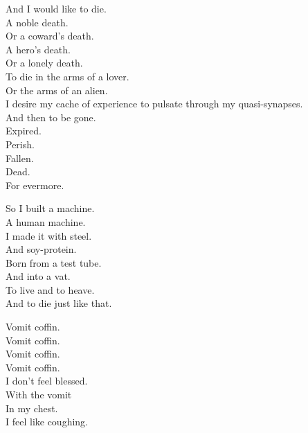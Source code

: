 And I would like to die. \\
A noble death. \\
Or a coward's death. \\
A hero's death. \\
Or a lonely death. \\
To die in the arms of a lover. \\
Or the arms of an alien. \\
I desire my cache of experience to pulsate through my quasi-synapses. \\
And then to be gone. \\
Expired. \\
Perish. \\
Fallen. \\
Dead. \\
For evermore. \\





So I built a machine. \\
A human machine. \\
I made it with steel. \\
And soy-protein. \\

Born from a test tube. \\
And into a vat. \\
To live and to heave. \\
And to die just like that. \\





Vomit coffin. \\
Vomit coffin. \\
Vomit coffin. \\
Vomit coffin. \\

I don't feel blessed. \\
With the vomit \\
In my chest. \\
I feel like coughing. \\

